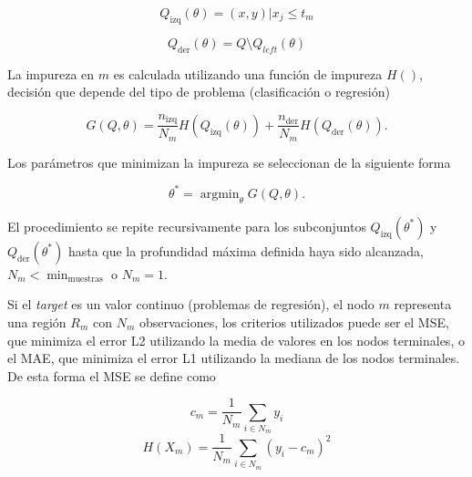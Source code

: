 \documentclass[spanish]{article}
\begin{document}
          \begin{equation}
            Q_{\text{izq}}(\theta) = (x, y) | x_j \leq t_m
          \end{equation}
          
          \begin{equation}
            Q_{\text{der}}(\theta) = Q \setminus Q_{left}(\theta)
          \end{equation}
          
          
          La impureza en $m$ es calculada utilizando una función de impureza $H()$, decisión que depende 
          del tipo de problema (clasificación o regresión)

          \begin{equation}
            G(Q, \theta) = \frac{n_{\text{izq}}}{N_m} H(Q_{\text{izq}}(\theta)) + \frac{n_{\text{der}}}{N_m} 
              H(Q_{\text{der}}(\theta)).
          \end{equation}            
          
          
          Los parámetros que minimizan la impureza se seleccionan de la siguiente forma
          
          \begin{equation}
            \theta^* = \operatorname{argmin}_\theta  G(Q, \theta).
          \end{equation}
         
          El procedimiento se repite recursivamente para los subconjuntos $Q_{\text{izq}}(\theta^*)$ y 
          $Q_{\text{der}}(\theta^*)$ hasta que la profundidad máxima definida haya sido alcanzada, 
          $N_m < \min_{\text{muestras}}$ o $N_m = 1$. \medskip
          
          Si el \emph{target} es un valor continuo (problemas de regresión), el nodo $m$ representa 
          una región $R_m$ con $N_m$ observaciones, los criterios utilizados puede ser el MSE, que minimiza 
          el error L2 utilizando la media de valores en los nodos terminales, o el MAE, que minimiza el 
          error L1 utilizando la mediana de los nodos terminales. De esta forma el MSE se define como
      
          \begin{equation}
            c_m = \frac{1}{N_m} \sum_{i \in N_m} y_i
          \end{equation}
          \begin{equation}
            H(X_m) = \frac{1}{N_m} \sum_{i \in N_m} (y_i - c_m)^2
          \end{equation}
          
\end{document}
